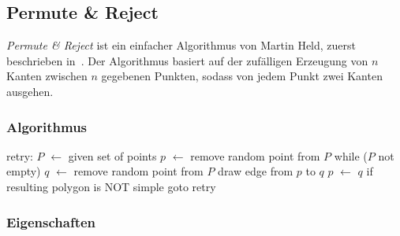 \subsection{Permute \& Reject}
\emph{Permute \& Reject} ist ein einfacher Algorithmus von Martin Held, zuerst beschrieben in~\cite{held98polygons}. Der Algorithmus basiert auf der zufälligen Erzeugung von $n$ Kanten zwischen $n$ gegebenen Punkten, sodass von jedem Punkt zwei Kanten ausgehen.
\subsubsection{Algorithmus}
\begin{code}[caption={Permute \& Reject},label=permutelisting,mathescape=true]
retry:
$P$ $\leftarrow$ given set of points
$p$ $\leftarrow$ remove random point from $P$
while ($P$ not empty)
  $q$ $\leftarrow$ remove random point from $P$
  draw edge from $p$ to $q$
  $p$ $\leftarrow$ $q$
if resulting polygon is NOT simple
  goto retry
\end{code}
\subsubsection{Eigenschaften}